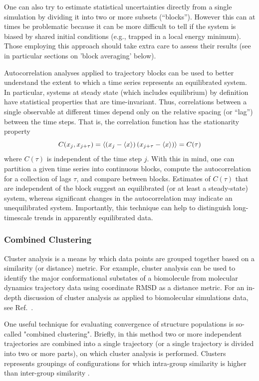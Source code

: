 One can also try to estimate statistical uncertainties directly from a single simulation by dividing it into two or more subsets (``blocks''). However this can at times be problematic because it can be more difficult to tell if the system is biased by shared initial conditions (e.g., trapped in a local energy minimum). Those employing this approach should take extra care to assess their results (see in particular sections on 'block averaging' below).


Autocorrelation analyses applied to trajectory blocks can be used to better understand the extent to which a time series represents an equilibrated system.  In particular, systems at steady state (which includes equilibrium) by definition have statistical properties that are time-invariant.  Thus, correlations between a single observable at different times depend only on the relative spacing (or ``lag'') between the time steps.  That is, the correlation function has the stationarity property
\begin{equation}
 C(x_j,x_{j+\tau}) = \left< \left(x_j - \langle x \rangle \right) \left(x_{j+\tau} - \langle x \rangle \right) \right> = C(\tau)
\end{equation}
where $C(\tau)$ is independent of the time step $j$.  With this in mind, one can partition a given time series into continuous blocks, compute the autocorrelation for a collection of lags $\tau$, and compare between blocks.  Estimates of $C(\tau)$ that are independent of the block suggest an equilibrated (or at least a steady-state) system, whereas significant changes in the autocorrelation may indicate an unequilibrated system.  Importantly, this technique can help to distinguish long-timescale trends in apparently equilibrated data.


\subsubsection*{Combined Clustering}

Cluster analysis is a means by which data points are grouped together based on a similarity (or distance) metric. For example, cluster analysis can be used to identify the major conformational substates of a biomolecule from molecular dynamics trajectory data using coordinate RMSD as a distance metric. For an in-depth discussion of cluster analysis as applied to biomolecular simulations data, see Ref.\ \citep{Shao2007}.

One useful technique for evaluating convergence of structure populations is so-called "combined clustering". Briefly, in this method two or more independent trajectories are combined into a single trajectory (or a single trajectory is divided into two or more parts), on which cluster analysis is performed. Clusters represents groupings of configurations for which intra-group similarity is higher than inter-group similarity \citep{Okur2006}.

